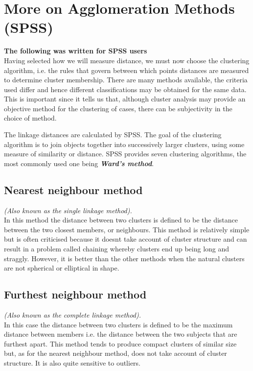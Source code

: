 \documentclass[RCluster.tex]{subfiles}
\begin{document}
\section{More on Agglomeration Methods (SPSS)}
\textbf{The following was written for SPSS users} \\
Having selected how we will measure distance, we must now choose the clustering algorithm, i.e. the rules that govern between which points distances are measured to determine cluster membership. There are many methods available, the criteria used differ and hence
different classifications may be obtained for the same data. This is important since it tells us that, although cluster analysis may provide an objective method for the clustering of cases, there can be subjectivity in the choice of method. 

The linkage distances are calculated by SPSS. The goal of the clustering algorithm is to join objects together into successively larger clusters, using some measure of similarity or distance. SPSS provides seven clustering algorithms, the most commonly used one being  \textbf{\textit{Ward's method}}.


\subsection{Nearest neighbour method} \textit{
(Also known as the single linkage method).\\}
In this method the distance between two clusters is defined to be the distance between
the two closest members, or neighbours. This method is relatively simple but is often
criticised because it doesnt take account of cluster structure and can result in a problem
called chaining whereby clusters end up being long and straggly. However, it is better
than the other methods when the natural clusters are not spherical or elliptical in shape.

\subsection{Furthest neighbour method}\textit{
(Also known as the complete linkage method).\\}
In this case the distance between two clusters is defined to be the maximum distance
between members  i.e. the distance between the two subjects that are furthest apart.
This method tends to produce compact clusters of similar size but, as for the nearest
neighbour method, does not take account of cluster structure. It is also quite sensitive
to outliers.
\end{document}
